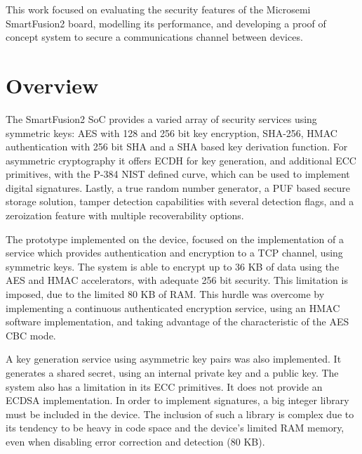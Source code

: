 \cleardoublepage
\label{chap:conclusion}

This work focused on evaluating the security features of the Microsemi SmartFusion2 board, modelling its performance, and developing a proof of concept system to secure a communications channel between devices.

\section{Overview} \label{chap:conclusion:overview}

The SmartFusion2 SoC provides a varied array of security services using symmetric keys: AES with 128 and 256 bit key encryption, SHA-256, HMAC authentication with 256 bit SHA and a SHA based key derivation function. For asymmetric cryptography it offers ECDH for key generation, and additional ECC primitives, with the P-384 NIST defined curve, which can be used to implement digital signatures. Lastly, a true random number generator, a PUF based secure storage solution, tamper detection capabilities with several detection flags, and a zeroization feature with multiple recoverability options.

The prototype implemented on the device, focused on the implementation of a service which provides authentication and encryption to a TCP channel, using symmetric keys. The system is able to encrypt up to 36 KB of data using the AES and HMAC accelerators, with adequate 256 bit security. This limitation is imposed, due to the limited 80 KB of RAM.
This hurdle was overcome by implementing a continuous authenticated encryption service, using an HMAC software implementation, and taking advantage of the characteristic of the AES CBC mode.

A key generation service using asymmetric key pairs was also implemented. It generates a shared secret, using an internal private key and a public key.
The system also has a limitation in its ECC primitives. It does not provide an ECDSA implementation. In order to implement signatures, a big integer library must be included in the device. The inclusion of such a library is complex due to its tendency to be heavy in code space and the device's limited RAM memory, even when disabling error correction and detection (80 KB). 

